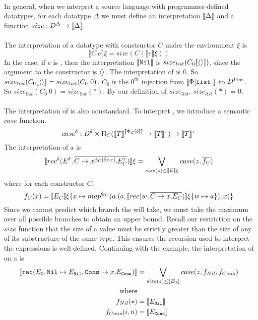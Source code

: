 \paragraph{}
\sloppypar
In general, when we interpret a source language with programmer-defined
datatypes, for each datatype $\Delta$ we must define an interpretation $\llbracket
\Delta \rrbracket$ and a function $size : D^\Delta \to \llbracket \Delta \rrbracket$.


\paragraph{}
The interpretation of a datatype with constructor $C$ under the environment
$\xi$ is
%
\[
  \llbracket C\ e\rrbracket \xi = size(C (\llbracket e \rrbracket \xi))
\]
%
In the  case, if $e$ is , then the interpretation $\llbracket \texttt{Nil}
\rrbracket$ is $size_{list}(C_0 \llbracket\langle\rangle\rrbracket)$, since the argument to the 
constructor is $\langle\rangle$. The interpretation of  is $0$. So
$size_{list}(C_0 \llbracket\langle\rangle\rrbracket = size_{list}(C_0\ 0)$. $C_0$ is the $0^{th}$
injection from $\llbracket \Phi[\texttt{list}\ \rrbracket$ to $D^{\texttt{list}}$.  So
$size_{list}(C_0\ 0) = size_{list}(\ast)$. By our definition of
$size_{list}$, $size_{list}(\ast) = 0$.


\paragraph{}
The interpretation of  is also nonstandard. To interpret , we
introduce a semantic $case$ function.
%
\[
  case^\delta : D^\delta \times \Uppi_{C} (\llbracket T\rrbracket^{\llbracket \Phi_C[\delta]\rrbracket} \to \llbracket T \rrbracket^\tau) \to \llbracket T \rrbracket^\tau
\]
%
The interpretation of a  is
%
\[
  \llbracket rec^\delta(E^\delta, \overline{C \mapsto x^{\phi_C[\delta \times \tau]}.E_C^\tau}) \rrbracket \xi = \bigvee\limits_{size(z) \leq \llbracket E \rrbracket \xi} case(z, \overline{f_C})
\]
%
where for each constructor $C$,
%
\[
  f_C(x) = \llbracket E_C \rrbracket \xi \{ x \mapsto map^{\Phi_C}(a.(a, \llbracket rec(w, \overline{C \mapsto x.E_C})\rrbracket \xi \{ w \mapsto a \}), x) \}
\]
%
Since we cannot predict which branch the  will take, we must take the
maximum over all possible branches to obtain an upper bound. Recall our
restriction on the $size$ function that the size of a value must be strictly
greater than the size of any of its substructure of the same type. This ensures
the recursion used to interpret the  expressions is well-defined.
Continuing with the  example, the interpretation of  on a  is
%
\begin{align*}
  \llbracket\texttt{rec}(E_0, \texttt{Nil} \mapsto E_{\texttt{Nil}}, \texttt{Cons} \mapsto x.E_{\texttt{Cons}})\rrbracket &= \bigvee\limits_{size(z) \leq \llbracket E_0 \rrbracket} case(z, f_{Nil}, f_{Cons}) \\
  \text{where} \\
  f_{Nil}(\ast) &= \llbracket E_{\texttt{Nil}} \rrbracket \\
  f_{Cons}(i,n) &= \llbracket E_{\texttt{Cons}} \rrbracket
\end{align*}
